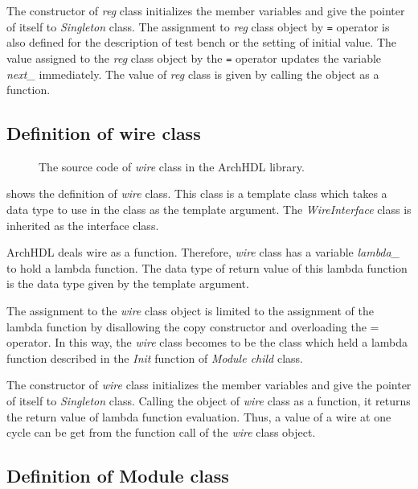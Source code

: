 The constructor of \textit{reg} class initializes the member variables and give the pointer of itself to \textit{Singleton} class.
The assignment to \textit{reg} class object by \verb`=` operator is also defined for the description of test bench or the setting of initial value.
The value assigned to the \textit{reg} class object by the \verb`=` operator updates the variable \textit{next\_} immediately.
The value of \textit{reg} class is given by calling the object as a function.

\subsection{Definition of wire class}

\begin{figure}[t]
 
 \caption{The source code of \textit{wire} class in the ArchHDL library.}
 \label{src:wire}
\end{figure}

 shows the definition of \textit{wire} class.
This class is a template class which takes a data type to use in the class as the template argument.
The \textit{WireInterface} class is inherited as the interface class.

ArchHDL deals wire as a function.
Therefore, \textit{wire} class has a variable \textit{lambda\_} to hold a lambda function.
The data type of return value of this lambda function is the data type given by the template argument.

The assignment to the \textit{wire} class object is limited to the assignment of the lambda function by disallowing the copy constructor and overloading the = operator.
In this way, the \textit{wire} class becomes to be the class which held a lambda function described in the \textit{Init} function of \textit{Module child} class.

The constructor of \textit{wire} class initializes the member variables and give the pointer of itself to \textit{Singleton} class.
Calling the object of \textit{wire} class as a function, it returns the return value of lambda function evaluation.
Thus, a value of a wire at one cycle can be get from the function call of the \textit{wire} class object.

\subsection{Definition of Module class}

